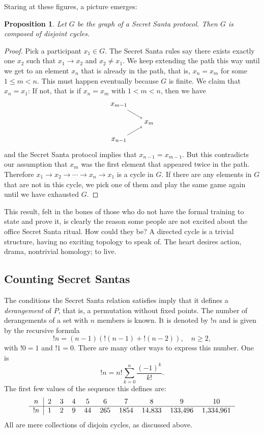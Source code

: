 \documentclass[10pt,a4paper]{amsart}
\newtheorem{prop}[theo]{Proposition}
\theoremstyle{definition}
\begin{document}
Staring at these figures, a picture emerges:


\begin{prop}
Let $G$ be the graph of a Secret Santa protocol.
Then $G$ is composed of disjoint cycles.
\end{prop}

\begin{proof}
Pick a participant $x_1 \in G$.
The Secret Santa rules say there exists exactly one $x_2$ such that $x_1 \to
x_2$ and $x_2 \not= x_1$.
We keep extending the path this way until we get to an element $x_n$ that is
already in the path, that is, $x_n = x_m$ for some $1 \leq m < n$.
This must happen eventually because $G$ is finite.
We claim that $x_n = x_1$:
If not, that is if $x_n = x_m$ with $1 < m < n$, then we have
$$
\begin{tikzpicture}
\node at (canvas polar cs:angle=120,radius=1cm) (A) {$x_{m-1}$};
\node at (canvas polar cs:angle=0,radius=1cm) (B) {$x_m$};
\node at (canvas polar cs:angle=240,radius=1cm) (E) {$x_{n-1}$};
\path[->] (A) edge node [right] {} (B);
\path[->] (E) edge node [right] {} (B);
\end{tikzpicture}
$$
and the Secret Santa protocol implies that $x_{n-1} = x_{m-1}$.
But this contradicts our assumption that $x_m$ was the first element that
appeared twice in the path.
Therefore $x_1 \to x_2 \to \cdots \to x_n \to x_1$ is a cycle in $G$.
If there are any elements in $G$ that are not in this cycle, we pick one of
them and play the same game again until we have exhausted $G$.
\end{proof}


This result, felt in the bones of those who do not have the formal training to
state and prove it, is clearly the reason some people are not excited about the
office Secret Santa ritual.
How could they be?
A directed cycle is a trivial structure, having no exciting topology to speak of.
The heart desires action, drama, nontrivial homology; to live.



\subsection*{Counting Secret Santas}

The conditions the Secret Santa relation satisfies imply that it defines
a \emph{derangement} of $P$, that is, a permutation without fixed points.
The number of derangements of a set with $n$ members is known.
It is denoted by $!n$ and is given by the recursive formula
\[
!n = (n-1) (!(n-1) + !(n-2)), \quad n \geq 2,
\]
with $!0 = 1$ and $!1 = 0$.
There are many other ways to express this number. One is
\[
!n = n! \sum_{k = 0}^n \frac{(-1)^k}{k!}.
\]
The first few values of the sequence this defines are:
\[
\begin{tabular}{c|ccccccccc}
$n$ & 2 & 3 & 4 & 5 & 6 & 7 & 8 & 9 & 10
\\
\hline
$!n$ & 1 & 2 & 9 & 44 & 265 & 1854 & 14,833 & 133,496 & 1,334,961
\end{tabular}
\]
All are mere collections of disjoin cycles, as discussed above.
\end{document}
